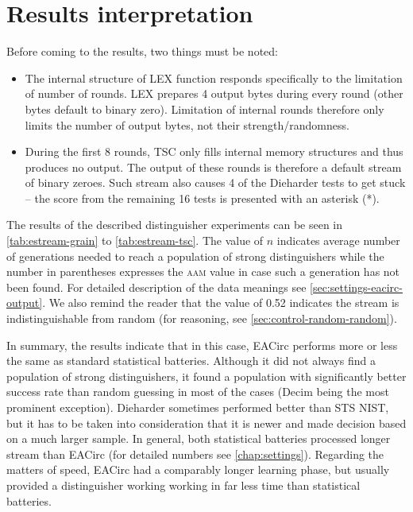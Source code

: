 \documentclass[12pt,oneside]{fithesis2}		%
\renewcommand{\_}{\leavevmode \kern0.0em\vbox{\hrule width0.4em}}
\newcommand{\squarebullet}{\textcolor{black}{\raisebox{0.15em}{\rule{4pt}{4pt}}}}
\newenvironment{myItemize}{
  \begin{itemize}[leftmargin=2em,rightmargin=1em,itemsep=\parskip ,parsep=0em,topsep=0em,partopsep=0em]
  \renewcommand{\labelitemi}{\squarebullet}
  \renewcommand{\labelitemii}{$\diamond$}
}{
  \end{itemize}
}
\begin{document}
\section{Results interpretation}
\label{sec:estream-results}

Before coming to the results, two things must be noted:
\begin{myItemize}
\item The internal structure of LEX function responds specifically to the limitation of number of rounds.
LEX prepares 4 output bytes during every round (other bytes default to binary zero). 
Limitation of internal rounds therefore only limits the number
of output bytes, not their strength/randomness.
\item During the first 8 rounds, TSC only fills internal memory structures and thus produces no output. The output of these rounds
is therefore a default stream of binary zeroes. Such stream also causes 4 of the Dieharder tests to get stuck --
the score from the remaining 16 tests is presented with an asterisk (*).
\end{myItemize}

\noindent
The results of the described distinguisher experiments can be seen in \autoref{tab:estream-grain} to
\autoref{tab:estream-tsc}. The value of $n$ indicates average number of generations needed to reach a population of
strong distinguishers while the number in parentheses expresses the \textsc{aam} value in case such a generation has not been
found. For detailed description of the data meanings see \autoref{sec:settings-eacirc-output}. We also remind the reader
that the value of 0.52 indicates the stream is indistinguishable from random (for reasoning, see \autoref{sec:control-random-random}).

In summary, the results indicate that in this case, EACirc performs more or less the same as standard statistical batteries.
Although it did not always find a population of strong distinguishers, it found a population with significantly better
success rate than random guessing in most of the cases (Decim being the most prominent exception).
Dieharder sometimes performed better than STS NIST, but it has to be taken into consideration that it is newer
and made decision based on a much larger sample. In general, both statistical batteries processed longer stream than EACirc
(for detailed numbers see \autoref{chap:settings}). Regarding the matters of speed, EACirc had a comparably longer learning phase,
but usually provided a distinguisher working working in far less time than statistical batteries.
\medskip
\end{document}
